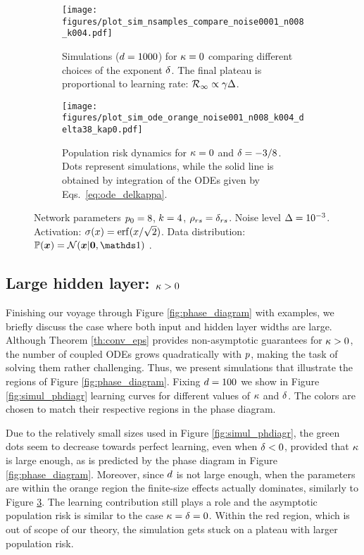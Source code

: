 \documentclass[10pt]{article}
\begin{document}
\begin{figure*}[tb!]
\centering
\begin{subfigure}[h]{.45\textwidth}
  \centering
  \texttt{[image: figures/plot\_sim\_nsamples\_compare\_noise0001\_n008\_k004.pdf]}
  \vskip -0.05in    
  \caption{Simulations ($d = 1000$) for $\kappa=0$ comparing different choices of the exponent $\delta$. The final plateau is proportional to learning rate: ${\cal R}_\infty \propto \gamma \Delta $.}
  \label{fig:plot_d_d32_compare}
\end{subfigure}%
\hspace{0.5cm}
\begin{subfigure}[h]{.45\textwidth}
  \centering
  \texttt{[image: figures/plot\_sim\_ode\_orange\_noise001\_n008\_k004\_delta38\_kap0.pdf]}
  \vskip -0.05in
  \caption{Population risk dynamics for $\kappa = 0$ and $\delta = -3/8$. Dots represent simulations, while the solid line is obtained by integration of the ODEs given by Eqs.~\eqref{eq:ode_delkappa}.}
  \label{fig:plot_kap0_onlyI4}
\end{subfigure}
\vskip -0.05in
\caption{Network parameters $p_0 =8$, $k=4$, $\rho_{rs} = \delta_{rs}$. Noise level $\Delta = 10^{-3}$. Activation: $\act(x) = \erf(x/\sqrt{2})$. Data distribution: $\Prob (\x) =  \gauss(\x | \bm{0}, \Id )$ .}
\end{figure*}

\subsection{Large hidden layer: \texorpdfstring{$\kappa > 0$}{K > 0}}
Finishing our voyage through Figure \ref{fig:phase_diagram} with examples, we briefly discuss the case where both input and hidden layer widths are large. Although Theorem \ref{th:conv_eps} provides non-asymptotic guarantees for $\kappa > 0$, the number of coupled ODEs grows quadratically with $p$, making the task of solving them rather challenging. Thus, we present simulations that illustrate the regions of Figure \ref{fig:phase_diagram}. Fixing $d=100$ we show in Figure \ref{fig:simul_phdiagr} learning curves for different values of $\kappa$ and $\delta$. The colors are chosen to match their respective regions in the phase diagram. 

Due to the relatively small sizes used in Figure \ref{fig:simul_phdiagr}, the green dots seem to decrease towards perfect learning, even when $\delta < 0$, provided that $\kappa$ is large enough, as is predicted by the phase diagram in Figure \ref{fig:phase_diagram}. Moreover, since $d$ is not large enough, when the parameters are within the orange region the finite-size effects actually dominates, similarly to Figure \ref{fig:plot_kap0_onlyI4}. The learning contribution still plays a role and the asymptotic population risk is similar to the case $\kappa=\delta=0$. Within the red region, which is out of scope of our theory, the simulation gets stuck on a plateau with larger population risk.
\end{document}
